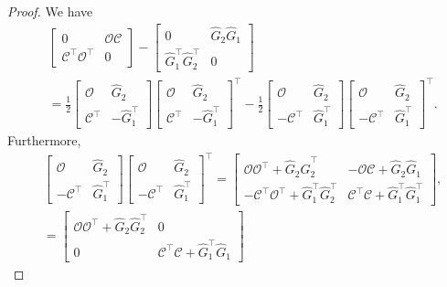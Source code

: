 \documentclass[11pt]{article}
\newcommand{\Ccal}{\mathcal{C}}
\newcommand{\Ocal}{\mathcal{O}}
\newcommand{\nn}{\nonumber}
\newcommand{\T}{\top}
\newcommand{\<}{\langle}
\renewcommand{\>}{\rangle}
\numberwithin{equation}{section}
\begin{document}
\begin{proof}
	We have
	\begin{align}
		&\begin{bmatrix}
			0 & \Ocal \Ccal \\
			\Ccal^\T\Ocal^\T & 0
		\end{bmatrix}
		-
		\begin{bmatrix}
			0 & \hat{G}_2 \hat{G}_1 \\
			\hat{G}_1^{ \T}\hat{G}_2^{ \T} & 0
		\end{bmatrix} \nn \\
		&= \frac{1}{2}
		\begin{bmatrix}
			\Ocal & \hat{G}_2 \\
			\Ccal^\T & - \hat{G}_1^{\T}
		\end{bmatrix}
		\begin{bmatrix}
			\Ocal & \hat{G}_2 \\
			\Ccal^\T & - \hat{G}_1^{\T}
		\end{bmatrix}^\T
		- \frac{1}{2}
		\begin{bmatrix}
			\Ocal & \hat{G}_2 \\
			-\Ccal^\T &  \hat{G}_1^{\T}
		\end{bmatrix}
		\begin{bmatrix}
			\Ocal & \hat{G}_2 \\
			-\Ccal^\T &  \hat{G}_1^{\T}
		\end{bmatrix}^\T. \label{eqn:Hermitian_Augmented_diff}
	\end{align}
	Furthermore,
	\begin{align}
		&\begin{bmatrix}
			\Ocal & \hat{G}_2 \\
			-\Ccal^\T &  \hat{G}_1^{\T}
		\end{bmatrix}
		\begin{bmatrix}
			\Ocal & \hat{G}_2 \\
			-\Ccal^\T &  \hat{G}_1^{\T}
		\end{bmatrix}^\T
		= 
		\begin{bmatrix}
			\Ocal \Ocal^\T + \hat{G}_2 \hat{G}_2^\T &  -\Ocal \Ccal + \hat{G}_2 \hat{G}_1\\
			-\Ccal^\T\Ocal^\T +  \hat{G}_1^{\T} \hat{G}_2^\T & \Ccal^\T \Ccal + \hat{G}_1^\T \hat{G}_1^\T
		\end{bmatrix}, \nn \\
		&=
		\begin{bmatrix}
			\Ocal \Ocal^\T + \hat{G}_2 \hat{G}_2^\T &  0\\
			0 & \Ccal^\T \Ccal + \hat{G}_1^\T \hat{G}_1

\end{bmatrix}
\end{align}
\end{proof}
\end{document}
